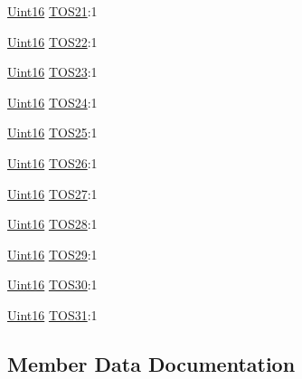 \begin{DoxyCompactItemize}
\hyperlink{_d_s_p2833x___device_8h_a59a9f6be4562c327cbfb4f7e8e18f08b}{Uint16} \hyperlink{struct_c_a_n_t_o_s___b_i_t_s_ae788eeda91b684c6dca42e1e21b13172}{T\+O\+S21}\+:1
\item 
\hyperlink{_d_s_p2833x___device_8h_a59a9f6be4562c327cbfb4f7e8e18f08b}{Uint16} \hyperlink{struct_c_a_n_t_o_s___b_i_t_s_ac55ce3c610b74e2fb3e30fe390f04fc3}{T\+O\+S22}\+:1
\item 
\hyperlink{_d_s_p2833x___device_8h_a59a9f6be4562c327cbfb4f7e8e18f08b}{Uint16} \hyperlink{struct_c_a_n_t_o_s___b_i_t_s_a5d82c9e01cf3dcaf3e90422b672f36e4}{T\+O\+S23}\+:1
\item 
\hyperlink{_d_s_p2833x___device_8h_a59a9f6be4562c327cbfb4f7e8e18f08b}{Uint16} \hyperlink{struct_c_a_n_t_o_s___b_i_t_s_afd5a0563d900abbecd6287f9c73908a4}{T\+O\+S24}\+:1
\item 
\hyperlink{_d_s_p2833x___device_8h_a59a9f6be4562c327cbfb4f7e8e18f08b}{Uint16} \hyperlink{struct_c_a_n_t_o_s___b_i_t_s_a2c8ba31761d3023d539dd87e54e577df}{T\+O\+S25}\+:1
\item 
\hyperlink{_d_s_p2833x___device_8h_a59a9f6be4562c327cbfb4f7e8e18f08b}{Uint16} \hyperlink{struct_c_a_n_t_o_s___b_i_t_s_aa17fdc83940a41446c2a60695d62a883}{T\+O\+S26}\+:1
\item 
\hyperlink{_d_s_p2833x___device_8h_a59a9f6be4562c327cbfb4f7e8e18f08b}{Uint16} \hyperlink{struct_c_a_n_t_o_s___b_i_t_s_a8738ea869e9aa266827a1130e51e9817}{T\+O\+S27}\+:1
\item 
\hyperlink{_d_s_p2833x___device_8h_a59a9f6be4562c327cbfb4f7e8e18f08b}{Uint16} \hyperlink{struct_c_a_n_t_o_s___b_i_t_s_a0c7a7ab08657f65ffc6c042341a6172c}{T\+O\+S28}\+:1
\item 
\hyperlink{_d_s_p2833x___device_8h_a59a9f6be4562c327cbfb4f7e8e18f08b}{Uint16} \hyperlink{struct_c_a_n_t_o_s___b_i_t_s_ac94f247c58d1028c5083926938dfc595}{T\+O\+S29}\+:1
\item 
\hyperlink{_d_s_p2833x___device_8h_a59a9f6be4562c327cbfb4f7e8e18f08b}{Uint16} \hyperlink{struct_c_a_n_t_o_s___b_i_t_s_a79610fd55ee28a099e94d7ea9aad695e}{T\+O\+S30}\+:1
\item 
\hyperlink{_d_s_p2833x___device_8h_a59a9f6be4562c327cbfb4f7e8e18f08b}{Uint16} \hyperlink{struct_c_a_n_t_o_s___b_i_t_s_aabb78fc61cce8c1252ee97c9ba0a505b}{T\+O\+S31}\+:1
\end{DoxyCompactItemize}


\subsection{Member Data Documentation}
\hypertarget{struct_c_a_n_t_o_s___b_i_t_s_a685ddeccbeb527bd93b8fa506ad3eaec}{}
